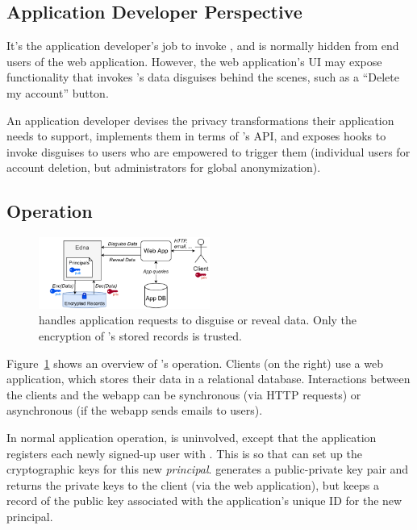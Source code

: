 \subsection{Application Developer Perspective}
%
It's the application developer's job to invoke \sys, and \sys is normally
hidden from end users of the web application.
%
However, the web application's UI may expose functionality that invokes \sys's
data disguises behind the scenes, such as a ``Delete my account'' button.
%

%
An application developer devises the privacy transformations their application needs to
support, implements them in terms of \sys's API, and exposes hooks to invoke disguises to
users who are empowered to trigger them (\eg individual users for account deletion, but
administrators for global anonymization).
%

\subsection{\sys Operation}

\begin{figure}[t]
  \centering
    \includegraphics[width=0.5\textwidth]{figs/edna_arch}
  \caption{\sys handles application requests to disguise or reveal data. Only the
    encryption of \sys's stored records is trusted.}
  \label{f:edna-overview}
\end{figure}

%
Figure~\ref{f:edna-overview} shows an overview of \sys's operation.
%
Clients (on the right) use a web application, which stores their data in a
relational database.
%
Interactions between the clients and the webapp can be synchronous (via HTTP
requests) or asynchronous (\eg if the webapp sends emails to users).
%

%
In normal application operation, \sys is uninvolved, except that the application
registers each newly signed-up user with \sys.
%
This is so that \sys can set up the cryptographic keys for this new \emph{principal}.
%
\sys generates a public-private key pair and returns the private keys to the
client (via the web application), but keeps a record of the public key associated
with the application's unique ID for the new principal.
%

